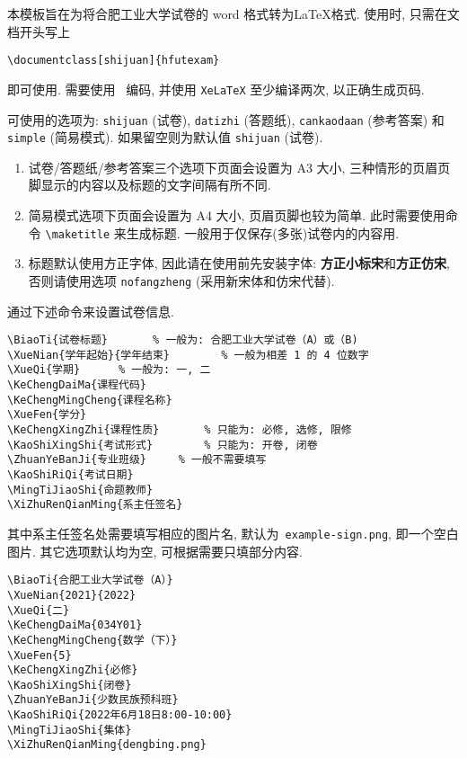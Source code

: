 \documentclass{hfutexam}
\begin{document}



\indent
本模板旨在为将合肥工业大学试卷的 word 格式转为\LaTeX{}格式.
使用时, 只需在文档开头写上
\begin{lstlisting}
\documentclass[shijuan]{hfutexam}
\end{lstlisting}
即可使用.
需要使用~{\color{blue}{\lstinline|UTF-8|}} 编码, 并使用 \lstinline|XeLaTeX| 至少编译两次, 以正确生成页码.

\indent
可使用的选项为: \lstinline|shijuan| (试卷), \lstinline|datizhi| (答题纸), \lstinline|cankaodaan| (参考答案) 和 \lstinline|simple| (简易模式). 如果留空则为默认值 \lstinline|shijuan| (试卷).
\begin{enumerate}
\item 试卷/答题纸/参考答案三个选项下页面会设置为 A3 大小, 三种情形的页眉页脚显示的内容以及标题的文字间隔有所不同.
\item 简易模式选项下页面会设置为 A4 大小, 页眉页脚也较为简单. 此时需要使用命令 \lstinline|\maketitle| 来生成标题.
一般用于仅保存(多张)试卷内的内容用.
\item 标题默认使用方正字体, 因此请在使用前先安装字体: {\bfseries\titlesongti 方正小标宋}和{\bfseries\titlefangsong 方正仿宋}, 否则请使用选项 \lstinline|nofangzheng| (采用新宋体和仿宋代替).
\end{enumerate}


\indent
通过下述命令来设置试卷信息.
\begin{lstlisting}
\BiaoTi{试卷标题}		% 一般为: 合肥工业大学试卷（A）或（B)
\XueNian{学年起始}{学年结束}		% 一般为相差 1 的 4 位数字
\XueQi{学期}		% 一般为: 一, 二
\KeChengDaiMa{课程代码}
\KeChengMingCheng{课程名称}
\XueFen{学分}
\KeChengXingZhi{课程性质}		% 只能为: 必修, 选修, 限修
\KaoShiXingShi{考试形式}		% 只能为: 开卷, 闭卷
\ZhuanYeBanJi{专业班级}		% 一般不需要填写
\KaoShiRiQi{考试日期}
\MingTiJiaoShi{命题教师}
\XiZhuRenQianMing{系主任签名} 
\end{lstlisting}
其中系主任签名处需要填写相应的图片名, 默认为~{\color{blue}\lstinline|example-sign.png|}, 即一个空白图片. 其它选项默认均为空, 可根据需要只填部分内容.
\newpage
\textit{\color{blue}{示例:}}
\begin{lstlisting}
\BiaoTi{合肥工业大学试卷（A）}
\XueNian{2021}{2022}
\XueQi{二}
\KeChengDaiMa{034Y01}
\KeChengMingCheng{数学（下）}
\XueFen{5}
\KeChengXingZhi{必修}
\KaoShiXingShi{闭卷}
\ZhuanYeBanJi{少数民族预科班}
\KaoShiRiQi{2022年6月18日8:00-10:00}
\MingTiJiaoShi{集体}
\XiZhuRenQianMing{dengbing.png}
\end{lstlisting}
\end{document}
